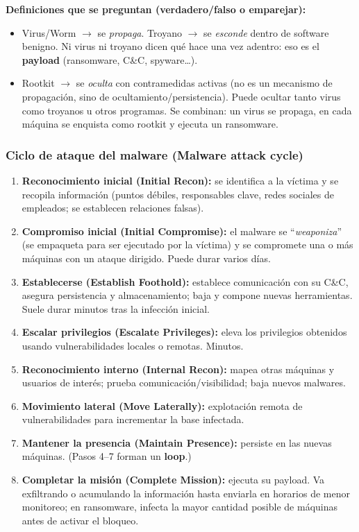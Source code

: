 \documentclass[../main.tex]{subfiles}
\begin{document}
\begin{examen}
\textbf{Definiciones que se preguntan (verdadero/falso o emparejar):}
\begin{itemize}[noitemsep]
  \item Virus/Worm $\rightarrow$ se \emph{propaga}. Troyano $\rightarrow$ se
        \emph{esconde} dentro de software benigno. Ni virus ni troyano dicen qué
        hace una vez adentro: eso es el \textbf{payload} (ransomware, C\&C, spyware\dots).
  \item Rootkit $\rightarrow$ se \emph{oculta} con contramedidas activas (no es un
        mecanismo de propagación, sino de ocultamiento/persistencia). Puede ocultar
        tanto virus como troyanos u otros programas. Se combinan: un virus se propaga,
        en cada máquina se enquista como rootkit y ejecuta un ransomware.
\end{itemize}
\end{examen}

\subsubsection{Ciclo de ataque del malware (Malware attack cycle)}

\begin{enumerate}[noitemsep]
  \item \textbf{Reconocimiento inicial (Initial Recon):} se identifica a la víctima
        y se recopila información (puntos débiles, responsables clave, redes sociales
        de empleados; se establecen relaciones falsas).
  \item \textbf{Compromiso inicial (Initial Compromise):} el malware se
        ``\textit{weaponiza}'' (se empaqueta para ser ejecutado por la víctima) y se
        compromete una o más máquinas con un ataque dirigido. Puede durar varios días.
  \item \textbf{Establecerse (Establish Foothold):} establece comunicación con su
        C\&C, asegura persistencia y almacenamiento; baja y compone nuevas
        herramientas. Suele durar minutos tras la infección inicial.
  \item \textbf{Escalar privilegios (Escalate Privileges):} eleva los privilegios
        obtenidos usando vulnerabilidades locales o remotas. Minutos.
  \item \textbf{Reconocimiento interno (Internal Recon):} mapea otras máquinas y
        usuarios de interés; prueba comunicación/visibilidad; baja nuevos malwares.
  \item \textbf{Movimiento lateral (Move Laterally):} explotación remota de
        vulnerabilidades para incrementar la base infectada.
  \item \textbf{Mantener la presencia (Maintain Presence):} persiste en las nuevas
        máquinas. (Pasos 4--7 forman un \textbf{loop}.)
  \item \textbf{Completar la misión (Complete Mission):} ejecuta su payload. Va
        exfiltrando o acumulando la información hasta enviarla en horarios de menor
        monitoreo; en ransomware, infecta la mayor cantidad posible de máquinas antes
        de activar el bloqueo.
\end{enumerate}
\end{document}

